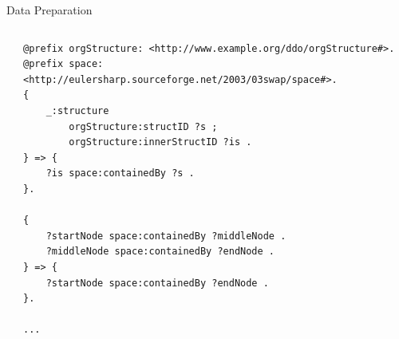 \documentclass{beamer}
\begin{document}
\begin{frame}[fragile]{Data Preparation}
\begin{columns}
\begin{column}{.3\textwidth}
\end{column}%
\hfill%
\begin{column}{.66\textwidth}
{\tiny
\begin{verbatim}
@prefix orgStructure: <http://www.example.org/ddo/orgStructure#>.
@prefix space: <http://eulersharp.sourceforge.net/2003/03swap/space#>.
{
    _:structure
        orgStructure:structID ?s ;
        orgStructure:innerStructID ?is .
} => {
    ?is space:containedBy ?s .
}.

{
    ?startNode space:containedBy ?middleNode .
    ?middleNode space:containedBy ?endNode .
} => {
    ?startNode space:containedBy ?endNode .
}.

...
\end{verbatim}
}
\end{column}%
\end{columns}
\end{frame}
\end{document}
